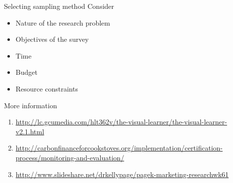 \documentclass[10pt, compress]{beamer}
\begin{document}
\begin{frame}[t]{Selecting sampling method}
    Consider
    \begin{itemize}
        \item Nature of the research problem
        \item Objectives of the survey
        \item Time
        \item Budget
        \item Resource constraints
    \end{itemize}
\end{frame}

\begin{frame}[t]{More information}
    \begin{enumerate}
        \small
        \item \url{http://lc.gcumedia.com/hlt362v/the-visual-learner/the-visual-learner-v2.1.html}
        \item  \url{http://carbonfinanceforcookstoves.org/implementation/certification-process/monitoring-and-evaluation/}
        \item \url{http://www.slideshare.net/drkellypage/pagek-marketing-researchwk61}
    \end{enumerate}
\end{frame}
\end{document}
